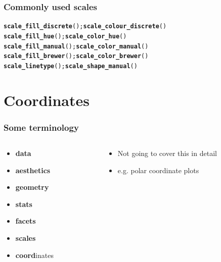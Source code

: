 \documentclass{beamer}\usepackage[]{graphicx}\usepackage[]{color}
\makeatletter
\newcommand{\hlstd}[1]{\textcolor[rgb]{0.345,0.345,0.345}{#1}}%
\newcommand{\hlkwd}[1]{\textcolor[rgb]{0.737,0.353,0.396}{\textbf{#1}}}%
\newenvironment{kframe}{%
 \def\at@end@of@kframe{}%
 \ifinner\ifhmode%
  \def\at@end@of@kframe{\end{minipage}}%
  \begin{minipage}{\columnwidth}%
 \fi\fi%
 \def\FrameCommand##1{\hskip\@totalleftmargin \hskip-\fboxsep
 \colorbox{shadecolor}{##1}\hskip-\fboxsep
     \hskip-\linewidth \hskip-\@totalleftmargin \hskip\columnwidth}%
 \MakeFramed {\advance\hsize-\width
   \@totalleftmargin\z@ \linewidth\hsize
   \@setminipage}}%
 {\par\unskip\endMakeFramed%
 \at@end@of@kframe}
\newenvironment{knitrout}{}{} %
\makeatother
\begin{document}

\begin{frame}[fragile]
\frametitle{Commonly used scales}
\begin{knitrout}\footnotesize
{}\color{fgcolor}\begin{kframe}
\begin{alltt}
\hlkwd{scale_fill_discrete}\hlstd{();} \hlkwd{scale_colour_discrete}\hlstd{()}
\hlkwd{scale_fill_hue}\hlstd{();} \hlkwd{scale_color_hue}\hlstd{()}
\hlkwd{scale_fill_manual}\hlstd{();}  \hlkwd{scale_color_manual}\hlstd{()}
\hlkwd{scale_fill_brewer}\hlstd{();} \hlkwd{scale_color_brewer}\hlstd{()}
\hlkwd{scale_linetype}\hlstd{();} \hlkwd{scale_shape_manual}\hlstd{()}
\end{alltt}
\end{kframe}
\end{knitrout}
\end{frame}


\section*{Coordinates}
\frame{\sectionpage}


\begin{frame}[fragile]
\frametitle{Some terminology}
\begin{columns}[t]

\begin{column}[T]{3cm}
\begin{itemize}
    \item \textbf{\color{gray}data}
    \item \textbf{\color{gray}aesthetics}
    \item \textbf{\color{gray}geometry}
    \item \textbf{\color{gray}stats}
    \item \textbf{\color{gray}facets}
    \item \textbf{\color{gray}scales}
    \item \textbf{coord}inates
\end{itemize}
\end{column}

\begin{column}[T]{8cm}
\begin{itemize}
    \item Not going to cover this in detail
    \item e.g. polar coordinate plots
\end{itemize}
\end{column}

\end{columns}
\end{frame}
\end{document}
